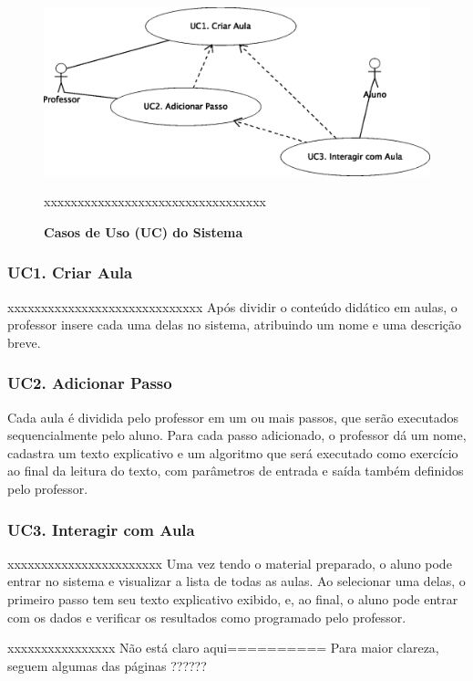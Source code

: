 \documentclass{abnt}
\begin{document}
\begin{figure}[htbp]
\begin{center}
\includegraphics[scale=0.75]{casos.eps}

xxxxxxxxxxxxxxxxxxxxxxxxxxxxxxxxx
	\caption{{\bf Casos de Uso (UC) do Sistema}}
\label{casos}
\end{center}
\end{figure}

\subsubsection{UC1. Criar Aula}
xxxxxxxxxxxxxxxxxxxxxxxxxxxxx
	Após dividir o conteúdo didático em aulas, o professor insere cada uma delas no sistema, atribuindo um nome e uma descrição breve.
\subsubsection{UC2. Adicionar Passo}
Cada aula é dividida pelo professor em um ou mais passos, que serão executados sequencialmente pelo aluno. Para cada passo adicionado, o professor dá um nome, cadastra um texto explicativo e um algoritmo que será executado como exercício ao final da leitura do texto, com parâmetros de entrada e saída também definidos pelo professor.
\subsubsection{UC3. Interagir com Aula}

xxxxxxxxxxxxxxxxxxxxxxx
	Uma vez tendo o material preparado, o aluno pode entrar no sistema e visualizar a lista de todas as aulas. Ao selecionar uma delas, o primeiro passo tem seu texto explicativo exibido, e, ao final, o aluno pode entrar com os dados e verificar os resultados como programado pelo professor.


xxxxxxxxxxxxxxxx  Não está claro aqui========== 
	Para maior clareza, seguem algumas das páginas  ??????
	
\end{document}
